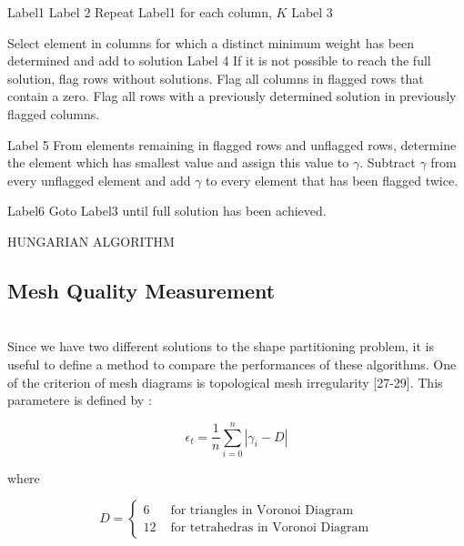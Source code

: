 \begin{algorithm}[H]
Label1  \;
Label 2  \; 
{Repeat Label1 for each column, $K$}
Label 3  \; 

Select element in columns for which a distinct minimum weight has been determined and add to solution
Label 4 \;
If it is not possible to reach the full solution, flag rows without solutions. Flag all columns in flagged rows that contain a zero. Flag all rows with a previously determined solution in previously flagged columns.
     
Label 5 \;
From elements remaining in flagged rows and unflagged rows, determine the element which has smallest value and assign this value to $\gamma$. Subtract $\gamma$  from every unflagged element and add  $\gamma$ to every element that has been flagged twice.
     
Label6 \;
Goto Label3 until full solution has been achieved.
     
\caption{HUNGARIAN ALGORITHM}
\end{algorithm}

\subsection{Mesh Quality Measurement}\hspace{0pt} \\
Since we have two different solutions to the shape partitioning problem, it is useful to define a method to compare the performances of these algorithms. One of the criterion of mesh diagrams is topological mesh irregularity [27-29]. This parametere is defined by : 

\begin{equation}
\epsilon _t = \frac{1}{n} \sum_{i = 0}^{n} |\gamma _i - D|
\end{equation}
	
where 

\begin{equation}
D = \left\{ \begin{array}{rl}
6                               &\mbox{ for triangles in Voronoi Diagram} \\
12                             &\mbox{ for tetrahedras in Voronoi Diagram}
\end{array} \right.
\end{equation}
	
